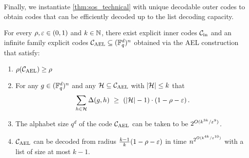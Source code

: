 Finally, we instantiate \cref{thm:sos_technical} with unique decodable outer codes to obtain codes that can be efficiently decoded up to the list decoding capacity.
\begin{corollary}\label{cor:algo-main}
For every $\rho, \varepsilon \in (0,1)$ and $k \in {\mathbb{N}}$, there exist explicit inner codes ${\mathcal C}_{\mathrm{in}}$ and an infinite family explicit codes ${ {\mathcal C}_{\mathrm{AEL}} } \subseteq ({\mathbb F}_q^d)^n$ obtained via the AEL construction that satisfy: 
\begin{enumerate}
\item $\rho({ {\mathcal C}_{\mathrm{AEL}} }) \geq \rho$
\item For any $g \in  ({\mathbb F}_q^d)^n$ and any ${\mathcal H} \subseteq { {\mathcal C}_{\mathrm{AEL}} }$ with $\lvert{\mathcal H}\rvert \leq k$ that
\[
\sum_{h \in {\mathcal H}} \Delta(g,h) ~\geq~ (\lvert{\mathcal H}\rvert-1) \cdot (1 - \rho - \varepsilon) \,.
\]
\item The alphabet size $q^d$ of the code ${ {\mathcal C}_{\mathrm{AEL}} }$ can be taken to be $2^{O(k^{3k}/\varepsilon^9)}$.
\item ${ {\mathcal C}_{\mathrm{AEL}} }$ can be decoded from radius $\frac{k-1}{k}(1-\rho-\varepsilon)$ in time $n^{2^{O(k^{4k}/\varepsilon^{10})}}$ with a list of size at most $k-1$.
\end{enumerate}
\end{corollary}

